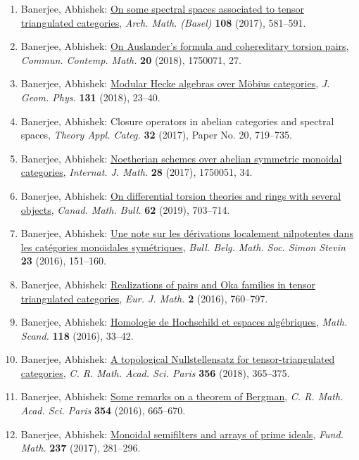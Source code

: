 \begin{enumerate}
\item Banerjee, Abhishek: \href{https://doi.org/10.1007/s00013-017-1025-4}{On some spectral spaces associated to tensor triangulated
categories}, \emph{Arch. Math. (Basel)} {\bf 108} (2017), 581--591.
\item Banerjee, Abhishek: \href{https://doi.org/10.1142/S0219199717500717}{On {A}uslander's formula and cohereditary torsion pairs}, \emph{Commun. Contemp. Math.} {\bf 20} (2018), 1750071, 27.
\item Banerjee, Abhishek: \href{https://doi.org/10.1016/j.geomphys.2018.04.008}{Modular {H}ecke algebras over {M}\"{o}bius categories}, \emph{J. Geom. Phys.} {\bf 131} (2018), 23--40.
\item Banerjee, Abhishek: Closure operators in abelian categories and spectral spaces, \emph{Theory Appl. Categ.} {\bf 32} (2017), Paper No. 20, 719--735.
\item Banerjee, Abhishek: \href{https://doi.org/10.1142/S0129167X17500513}{Noetherian schemes over abelian symmetric monoidal categories}, \emph{Internat. J. Math.} {\bf 28} (2017), 1750051, 34.
\item Banerjee, Abhishek: \href{https://doi.org/10.4153/s0008439518000656}{On differential torsion theories and rings with several
objects}, \emph{Canad. Math. Bull.} {\bf 62} (2019), 703--714.
\item Banerjee, Abhishek: \href{http://projecteuclid.org/euclid.bbms/1457560860}{Une note sur les d\'erivations localement nilpotentes dans les
cat\'egories mono\"\i dales sym\'etriques}, \emph{Bull. Belg. Math. Soc. Simon Stevin} {\bf 23} (2016), 151--160.
\item Banerjee, Abhishek: \href{http://dx.doi.org/10.1007/s40879-016-0108-2}{Realizations of pairs and {O}ka families in tensor
triangulated categories}, \emph{Eur. J. Math.} {\bf 2} (2016), 760--797.
\item Banerjee, Abhishek: \href{http://dx.doi.org/10.7146/math.scand.a-23294}{Homologie de {H}ochschild et espaces alg\'ebriques}, \emph{Math. Scand.} {\bf 118} (2016), 33--42.
\item Banerjee, Abhishek: \href{https://doi.org/10.1016/j.crma.2018.02.012}{A topological {N}ullstellensatz for tensor-triangulated
categories}, \emph{C. R. Math. Acad. Sci. Paris} {\bf 356} (2018), 365--375.
\item Banerjee, Abhishek: \href{http://dx.doi.org/10.1016/j.crma.2016.05.005}{Some remarks on a theorem of {B}ergman}, \emph{C. R. Math. Acad. Sci. Paris} {\bf 354} (2016), 665--670.
\item Banerjee, Abhishek: \href{https://doi.org/10.4064/fm218-8-2016}{Monoidal semifilters and arrays of prime ideals}, \emph{Fund. Math.} {\bf 237} (2017), 281--296.

\end{enumerate}
